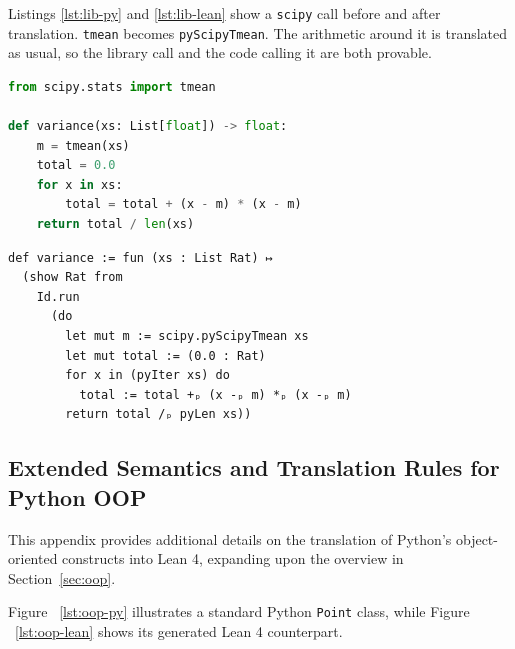 \documentclass{article}
\newcommand{\code}{\lstinline}
\begin{document}
Listings \ref{lst:lib-py} and \ref{lst:lib-lean} show a \code{scipy} call before and after translation. \code{tmean} becomes \code{pyScipyTmean}. The arithmetic around it is translated as usual, so the library call and the code calling it are both provable.

\noindent
\begin{minipage}[t]{0.42\textwidth}
\begin{lstlisting}[language=python,caption={Python using \texttt{scipy}.},label={lst:lib-py},breaklines=true]
from scipy.stats import tmean

def variance(xs: List[float]) -> float:
    m = tmean(xs)
    total = 0.0
    for x in xs:
        total = total + (x - m) * (x - m)
    return total / len(xs)
\end{lstlisting}
\end{minipage}%
\hfill
\begin{minipage}[t]{0.54\textwidth}
\begin{lstlisting}[style=lean,caption={The generated provable twin.},label={lst:lib-lean},breaklines=true]
def variance := fun (xs : List Rat) ↦
  (show Rat from
    Id.run
      (do
        let mut m := scipy.pyScipyTmean xs
        let mut total := (0.0 : Rat)
        for x in (pyIter xs) do
          total := total +ₚ (x -ₚ m) *ₚ (x -ₚ m)
        return total /ₚ pyLen xs))
\end{lstlisting}
\end{minipage}

\subsection{Extended Semantics and Translation Rules for Python OOP} \label{oop-appendix}

This appendix provides additional details on the translation of Python's object-oriented constructs into Lean 4, expanding upon the overview in Section~\ref{sec:oop}.

Figure ~\ref{lst:oop-py} illustrates a standard Python \texttt{Point} class, while Figure ~\ref{lst:oop-lean} shows its generated Lean 4 counterpart.
\end{document}

